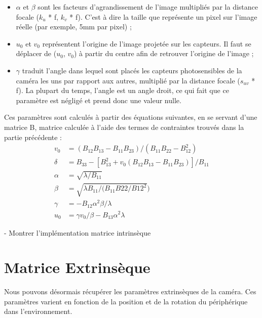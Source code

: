\documentclass[a4paper]{article}
\begin{document}
\begin{itemize}
\item $\alpha$ et $\beta$ sont les facteurs d'agrandissement de l'image multipliés par la distance focale ($k_u$ * f, $k_v$ * f). C'est à dire la taille que représente un pixel sur l'image réelle (par exemple, 5mm par pixel) ;
\item $u_0$ et $v_0$ représentent l'origine de l'image projetée sur les capteurs. Il faut se déplacer de ($u_0$, $v_0$) à partir du centre afin de retrouver l'origine de l'image ;
\item $\gamma$ traduit l'angle dans lequel sont placés les capteurs photosensibles de la caméra les uns par rapport aux autres, multiplié par la distance focale ($s_{uv}$ * f). La plupart du temps, l'angle est un angle droit, ce qui fait que ce paramètre est négligé et prend donc une valeur nulle.
\end{itemize}

Ces paramètres sont calculés à partir des équations suivantes, en se servant d'une matrice B, matrice calculée à l'aide des termes de contraintes trouvés dans la partie précédente :
\begin{equation}
  \begin{aligned}
    v_0 &= (B_{12}B_{13} - B_{11}B_{23}) / (B_{11}B_{22} -B_{12}^2) \\
    \delta &= B_{33} - [B_{13}^2 + v_0(B_{12}B_{13} - B_{11}B_{23})] / B_{11} \\
    \alpha &= \sqrt{\lambda/B_{11}} \\
    \beta &= \sqrt{\lambda B_{11}/(B_{11}B{22}/B{12}^2}) \\
    \gamma &= -B_{12}\alpha^2\beta/\lambda \\
    u_0 &= \gamma v_0 /\beta - B_{13}\alpha^2\lambda
  \end{aligned}
\end{equation}

- Montrer l'implémentation matrice intrinsèque

\clearpage

\section{Matrice Extrinsèque}
Nous pouvons désormais récupérer les paramètres extrinsèques de la caméra.
Ces paramètres varient en fonction de la position et de la rotation du périphérique dans l'environnement.
\end{document}
